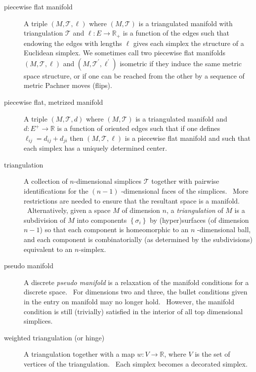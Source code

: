 \begin{description}
\item[piecewise flat manifold] A triple $\left( M,\mathcal{T},\ell \right) $
where $\left( M,\mathcal{T}\right) $ is a triangulated manifold with
triangulation $\mathcal{T}$ and $\ell :E\rightarrow \mathbb{R}_{+}$ is a
function of the edges such that endowing the edges with lengths $\ell $
gives each simplex the structure of a Euclidean simplex. We sometimes call
two piecewise flat manifolds $\left( M,\mathcal{T},\ell \right) $ and $%
\left( M,\mathcal{T}^{\prime },\ell ^{\prime }\right) $ isometric if they
induce the same metric space structure, or if one can be reached from the
other by a sequence of metric Pachner moves (flips).\ 

\item[piecewise flat, metrized manifold] A triple $\left( M,\mathcal{T}%
,d\right) $ where $\left( M,\mathcal{T}\right) $ is a triangulated manifold
and $d:E^{+}\rightarrow \mathbb{R}$ is a function of oriented edges such
that if one defines $\ell _{ij}=d_{ij}+d_{ji}$ then $\left( M,\mathcal{T}%
,\ell \right) $ is a piecewise flat manifold and such that each simplex has
a uniquely determined center.

\item[triangulation] A collection of $n$-dimensional simplices $\mathcal{T}$
together with pairwise identifications for the $\left( n-1\right) $%
-dimensional faces of the simplices. \ More restrictions are needed to
ensure that the resultant space is a manifold. \ Alternatively, given a
space $M$ of dimension $n$, a \textit{triangulation} of $M$ is a subdivision
of $M$ into components $\left\{ \sigma _{i}\right\} $ by (hyper)surfaces (of
dimension $n-1$) so that each component is homeomorphic to an $n$%
-dimensional ball, and each component is combinatorially (as determined by
the subdivisions) equivalent to an $n$-simplex. \ 

\item[pseudo manifold] A discrete \textit{pseudo manifold} is a relaxation
of the manifold conditions for a discrete space. \ For dimensions two and
three, the bullet conditions given in the entry on manifold may no longer
hold. \ However, the manifold condition is still (trivially) satisfied in
the interior of all top dimensional simplices.

\item[weighted triangulation (or hinge)] A triangulation together with a map 
$w:V\rightarrow 
\mathbb{R}
$, where $V$ is the set of vertices of the triangulation. \ Each simplex
becomes a decorated simplex. \ 


\end{description}
